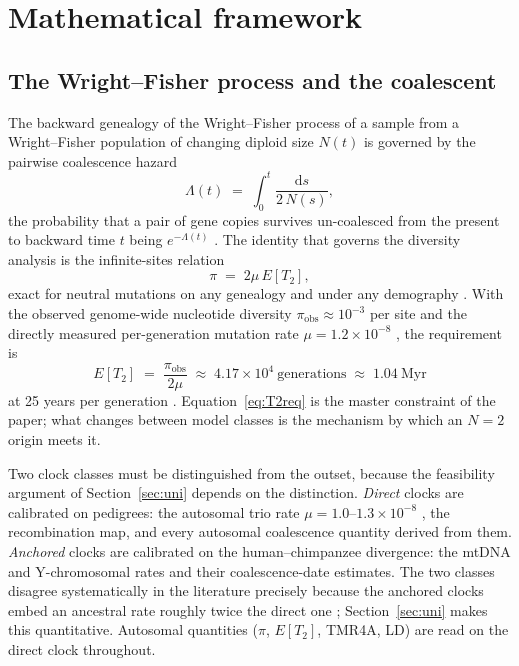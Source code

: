 \section{Mathematical framework}\label{sec:framework}

\subsection{The Wright--Fisher process and the coalescent}
The backward genealogy of the Wright--Fisher process \citep{Wright1931}
of a sample from a Wright--Fisher population of changing diploid size
$N(t)$ is governed by the pairwise coalescence hazard
\begin{equation}\label{eq:hazard}
\Lambda(t) \;=\; \int_0^{t} \frac{\mathrm{d}s}{2\,N(s)} ,
\end{equation}
the probability that a pair of gene copies survives un-coalesced from the
present to backward time $t$ being $e^{-\Lambda(t)}$
\citep{Hudson1990,CrowKimura1970}. The identity that governs the diversity
analysis is the infinite-sites relation
\begin{equation}\label{eq:piconstraint}
\pi \;=\; 2\mu\,E[T_2],
\end{equation}
exact for neutral mutations on any genealogy and under any demography
\citep{Hudson1990}. With the observed genome-wide nucleotide diversity
$\pi_{\mathrm{obs}} \approx 10^{-3}$ per site \citep{Auton2015} and the
directly measured per-generation mutation rate
$\mu = 1.2\times10^{-8}$ \citep{Kong2012,Scally2012,Jonsson2017}, the
requirement is
\begin{equation}\label{eq:T2req}
E[T_2] \;=\; \frac{\pi_{\mathrm{obs}}}{2\mu} \;\approx\; 4.17\times10^{4}\ \text{generations}
\;\approx\; 1.04\ \text{Myr}
\end{equation}
at 25 years per generation \citep{Fenner2005,Scally2012}. Equation~\eqref{eq:T2req} is the master
constraint of the paper; what
changes between model classes is the mechanism by which an $N=2$ origin meets it.

Two clock classes must be distinguished from the outset, because the
feasibility argument of Section~\ref{sec:uni} depends on the distinction.
\emph{Direct} clocks are calibrated on pedigrees: the autosomal trio rate
$\mu = 1.0$--$1.3\times10^{-8}$ \citep{Scally2012,Jonsson2017}, the
recombination map, and every autosomal coalescence quantity derived from
them. \emph{Anchored} clocks are calibrated on the human--chimpanzee
divergence: the mtDNA and Y-chromosomal rates and their coalescence-date
estimates. The two classes disagree systematically in the literature
precisely because the anchored clocks embed an ancestral rate roughly twice
the direct one \citep{Scally2012}; Section~\ref{sec:uni} makes this
quantitative. Autosomal quantities ($\pi$, $E[T_2]$, TMR4A, LD) are read on
the direct clock throughout.

